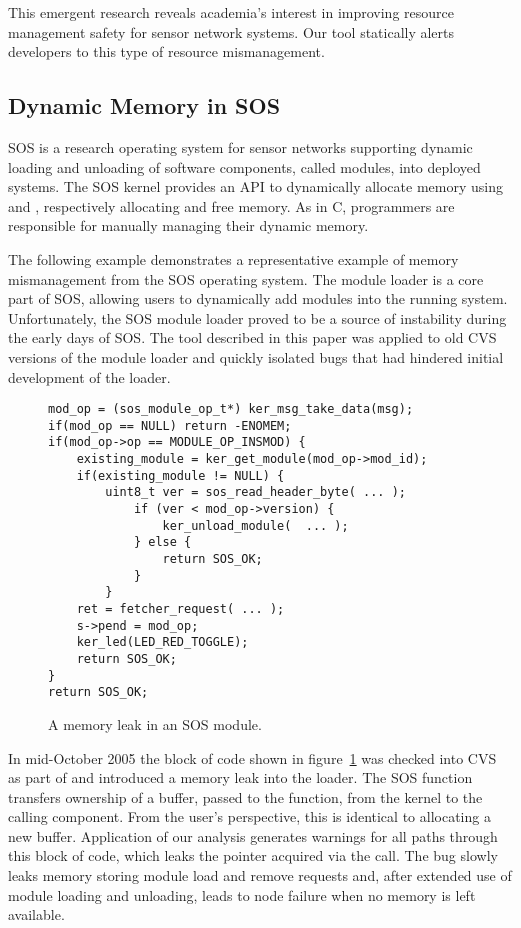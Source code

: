 This emergent research reveals academia's interest in improving resource
management safety for sensor network systems.  
%
Our tool statically alerts developers to this type of resource
mismanagement.



\subsection{Dynamic Memory in SOS}



SOS is a research operating system for sensor networks supporting dynamic
loading and unloading of software components, called modules, into deployed
systems.
%
The SOS kernel provides an API to dynamically allocate memory using
 and , respectively allocating and
free memory.  
%
As in C, programmers are responsible for manually managing their dynamic
memory.  


The following example demonstrates a representative example of memory
mismanagement from the SOS operating system.
%
The module loader is a core part of SOS, allowing users to dynamically add
modules into the running system.
%
Unfortunately, the SOS module loader proved to be a source of instability
during the early days of SOS.
%
The tool described in this paper was applied to old CVS versions of the
module loader and quickly isolated bugs that had hindered initial
development of the loader.



\begin{figure}[tp]
\centering
\lstset{numbers=left, language=C}
\begin{lstlisting}
mod_op = (sos_module_op_t*) ker_msg_take_data(msg);
if(mod_op == NULL) return -ENOMEM;
if(mod_op->op == MODULE_OP_INSMOD) {
    existing_module = ker_get_module(mod_op->mod_id);
    if(existing_module != NULL) {
        uint8_t ver = sos_read_header_byte( ... );
            if (ver < mod_op->version) {
                ker_unload_module(  ... );
            } else {
                return SOS_OK;
            }
        }
    ret = fetcher_request( ... );
    s->pend = mod_op;
    ker_led(LED_RED_TOGGLE);
    return SOS_OK;
}
return SOS_OK;
\end{lstlisting}
\caption{\label{fig:leak}A memory leak in an SOS module.}
\end{figure}



In mid-October 2005 the block of code shown in figure~\ref{fig:leak} was
checked into CVS as part of  and introduced a memory leak into
the loader.  
%
The SOS function  transfers ownership of a buffer,
passed to the function, from the kernel to the calling component.
%
From the user's perspective, this is identical to allocating a new buffer.
%
Application of our analysis generates warnings for all paths through this
block of code, which leaks the  pointer acquired via the
 call.  
%
The bug slowly leaks memory storing module load and remove requests and, after
extended use of module loading and unloading, leads to node failure when no
memory is left available.



